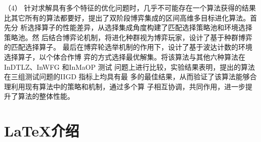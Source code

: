 （4） 针对求解具有多个特征的优化问题时，几乎不可能存在一个算法获得的结果
比其它所有的算法都要好，提出了双阶段博弈集成的区间高维多目标进化算法。首先分
析选择算子的性能差异，从选择集成角度构建了匹配选择策略池和环境选择策略池。然
后结合博弈论机制，将进化种群视为博弈玩家，设计了基于种群博弈的匹配选择算子。
最后在博弈轮选举机制的作用下，设计了基于波达计数的环境选择算子，以个体合作博
弈的方式选择最优解集。将该算法与其他六种算法在InDTLZ、InWFG 和InMaOP 测试
问题上进行比较，实验结果表明，提出的算法在三组测试问题的IIGD 指标上均具有最
多的最佳结果，从而验证了该算法能够合理利用现有算法中的策略和机制，通过多个算
子相互协调，共同作用，进一步提升了算法的整体性能。
\section{\LaTeX 介绍}
\zhlipsum[1-3]

